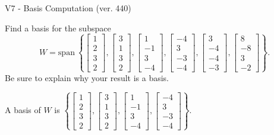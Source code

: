 \begin{exercise}
  \begin{exerciseTitle}V7 - Basis Computation (ver. 440)\end{exerciseTitle}
  \begin{exerciseStatement}
    Find a basis for the subspace 
\[W=\mathrm{span}\ \left\{\left[\begin{array}{r}
1 \\
2 \\
3 \\
2
\end{array}\right] , \left[\begin{array}{r}
3 \\
1 \\
3 \\
2
\end{array}\right] , \left[\begin{array}{r}
1 \\
-1 \\
3 \\
-4
\end{array}\right] , \left[\begin{array}{r}
-4 \\
3 \\
-3 \\
-4
\end{array}\right] , \left[\begin{array}{r}
3 \\
-4 \\
-4 \\
-3
\end{array}\right] , \left[\begin{array}{r}
8 \\
-8 \\
3 \\
-2
\end{array}\right]\right\}.\]
 Be sure to explain why your result is a basis.


  \end{exerciseStatement}
  \begin{exerciseAnswer}
   A basis of \(W\) is  \(\left\{\left[\begin{array}{r}
1 \\
2 \\
3 \\
2
\end{array}\right] , \left[\begin{array}{r}
3 \\
1 \\
3 \\
2
\end{array}\right] , \left[\begin{array}{r}
1 \\
-1 \\
3 \\
-4
\end{array}\right] , \left[\begin{array}{r}
-4 \\
3 \\
-3 \\
-4
\end{array}\right]\right\}\).
  


  \end{exerciseAnswer}
\end{exercise}